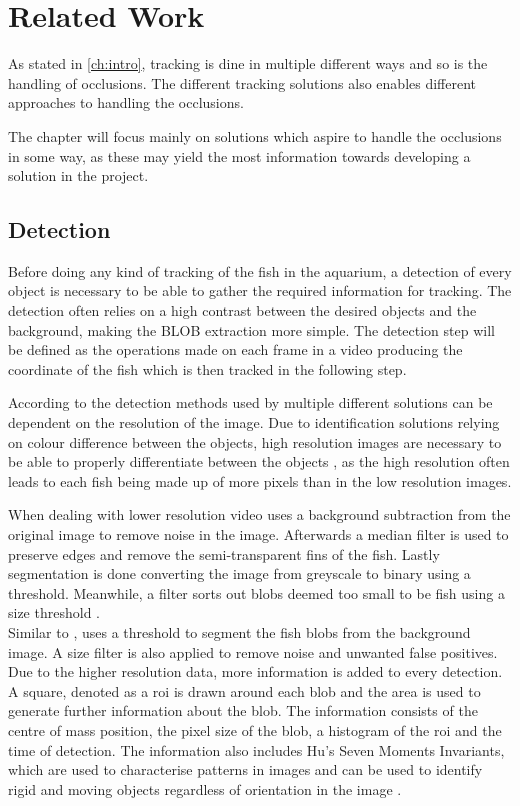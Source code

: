 \graphicspath{{figures/research/}}
\chapter{Related Work}\label{ch:related}
As stated in \autoref{ch:intro}, tracking is dine in multiple different ways and so is the handling of occlusions. The different tracking solutions also enables different approaches to handling the occlusions.

The chapter will focus mainly on solutions which aspire to handle the occlusions in some way, as these may yield the most information towards developing a solution in the project.

\section{Detection}
Before doing any kind of tracking of the fish in the aquarium, a detection of every object is necessary to be able to gather the required information for tracking. The detection often relies on a high contrast between the desired objects and the background, making the BLOB extraction more simple. The detection step will be defined as the operations made on each frame in a video producing the coordinate of the fish which is then tracked in the following step.

According to \cite{Delcourt2018} the detection methods used by multiple different solutions can be dependent on the resolution of the image. Due to identification solutions relying on colour difference between the objects, high resolution images are necessary to be able to properly differentiate between the objects \citep{idtracker2014, Feijo2018}, as the high resolution often leads to each fish being made up of more pixels than in the low resolution images.

When dealing with lower resolution video \cite{Dolado2015} uses a background subtraction from the original image to remove noise in the image. Afterwards a median filter is used to preserve edges and remove the semi-transparent fins of the fish. Lastly segmentation is done converting the image from greyscale to binary using a threshold. Meanwhile, a filter sorts out \gls{blob}s deemed too small to be fish using a size threshold \citep{Dolado2015}.\\

Similar to \cite{Dolado2015}, \cite{Rodriguez2017} uses a threshold to segment the fish \gls{blob}s from the background image. A size filter is also applied to remove noise and unwanted false positives. Due to the higher resolution data, more information is added to every detection. A square, denoted as a \gls{roi} is drawn around each \gls{blob} and the area is used to generate further information about the \gls{blob}. The information consists of the centre of mass position, the pixel size of the \gls{blob}, a histogram of the \gls{roi} and the time of detection. The information also includes Hu's Seven Moments Invariants, which are used to characterise patterns in images and can be used to identify rigid and moving objects regardless of orientation in the image \citep{Rodriguez2017}.\\

